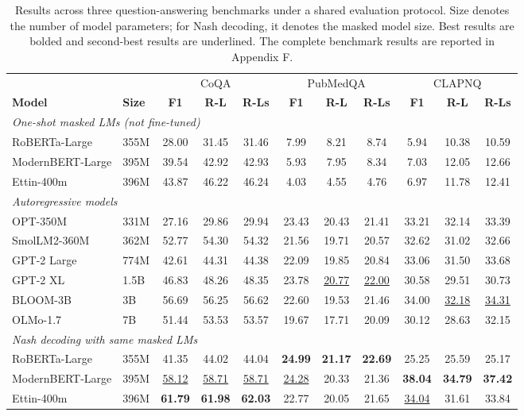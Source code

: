\begin{table}[t]
\centering
\begin{tabular}{llccccccccc}
\toprule
& & \multicolumn{3}{c}{CoQA} & \multicolumn{3}{c}{PubMedQA} & \multicolumn{3}{c}{CLAPNQ} \\
\textbf{Model} & \textbf{Size} & \textbf{F1} & \textbf{R-L} & \textbf{R-Ls} & \textbf{F1} & \textbf{R-L} & \textbf{R-Ls} & \textbf{F1} & \textbf{R-L} & \textbf{R-Ls} \\
\midrule
\multicolumn{11}{l}{\textit{One-shot masked LMs (not fine-tuned)}} \\
RoBERTa-Large & 355M & 28.00 & 31.45 & 31.46 & 7.99 & 8.21 & 8.74 & 5.94 & 10.38 & 10.59 \\
ModernBERT-Large & 395M & 39.54 & 42.92 & 42.93 & 5.93 & 7.95 & 8.34 & 7.03 & 12.05 & 12.66 \\
Ettin-400m & 396M & 43.87 & 46.22 & 46.24 & 4.03 & 4.55 & 4.76 & 6.97 & 11.78 & 12.41 \\
\midrule
\multicolumn{11}{l}{\textit{Autoregressive models}} \\
OPT-350M & 331M & 27.16 & 29.86 & 29.94 & 23.43 & 20.43 & 21.41 & 33.21 & 32.14 & 33.39 \\
SmolLM2-360M & 362M & 52.77 & 54.30 & 54.32 & 21.56 & 19.71 & 20.57 & 32.62 & 31.02 & 32.66 \\
GPT-2 Large & 774M & 42.61 & 44.31 & 44.38 & 22.09 & 19.85 & 20.84 & 33.06 & 31.50 & 33.68 \\
GPT-2 XL & 1.5B & 46.83 & 48.26 & 48.35 & 23.78 & \underline{20.77} & \underline{22.00} & 30.58 & 29.51 & 30.73 \\
BLOOM-3B & 3B & 56.69 & 56.25 & 56.62 & 22.60 & 19.53 & 21.46 & 34.00 & \underline{32.18} & \underline{34.31} \\
OLMo-1.7 & 7B & 51.44 & 53.53 & 53.57 & 19.67 & 17.71 & 20.09 & 30.12 & 28.63 & 32.15 \\
\midrule
\multicolumn{11}{l}{\textit{Nash decoding with same masked LMs}} \\
RoBERTa-Large & 355M & 41.35 & 44.02 & 44.04 & \textbf{24.99} & \textbf{21.17} & \textbf{22.69} & 25.25 & 25.59 & 25.17 \\
ModernBERT-Large & 395M & \underline{58.12} & \underline{58.71} & \underline{58.71} & \underline{24.28} & 20.33 & 21.36 & \textbf{38.04} & \textbf{34.79} & \textbf{37.42} \\
Ettin-400m & 396M & \textbf{61.79} & \textbf{61.98} & \textbf{62.03} & 22.77 & 20.05 & 21.65 & \underline{34.04} & 31.61 & 33.84 \\
\bottomrule
\end{tabular}
\caption{Results across three question-answering benchmarks under a shared evaluation protocol. Size denotes the number of model parameters; for Nash decoding, it denotes the masked model size. Best results are bolded and second-best results are underlined. The complete benchmark results are reported in Appendix F.}
\label{tab:main}
\end{table}
